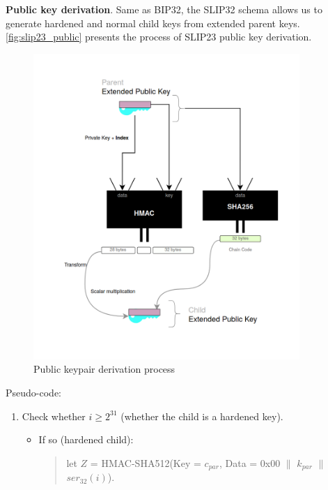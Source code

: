\begin{adjustwidth}{0.5cm}{}
\begin{enumerate}
              \bigskip

    \end{enumerate}


    \bigskip
    {\textbf{Public key derivation}}. Same as BIP32, the SLIP32 schema allows us to generate hardened and normal child keys from extended parent keys. \autoref{fig:slip23_public} presents the process of SLIP23 public key derivation.
    \begin{figure}[ht!]
        \centering
        \includegraphics[width=0.9\textwidth]{images/slip23_public.png}
        \caption[Public keypair derivation process]{Public keypair derivation process}
        \label{fig:slip23_public}
    \end{figure}

    Pseudo-code:
    \begin{enumerate}
        \item Check whether $i \geq 2^{31}$ (whether the child is a hardened key).
              \begin{itemize}
                  \item If so (hardened child):
                        \begin{quote}
                            let $Z$ = HMAC-SHA512(Key = $c_{par}$, Data = 0x00 $\parallel$ $k_{par}$ $\parallel$ $ser_{32}(i)$).


\end{quote}
\end{itemize}
\end{enumerate}
\end{adjustwidth}
